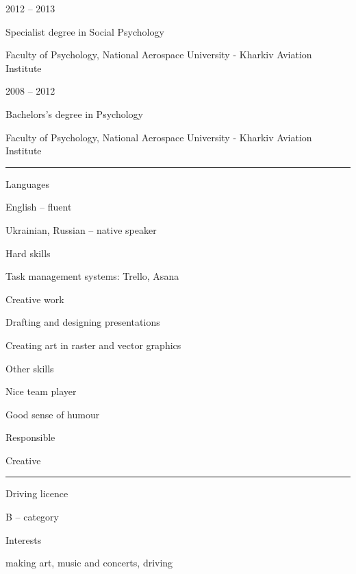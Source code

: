 \documentclass[a4paper,10pt]{article}
\newlength{\cvcolumngapwidth}
\newlength{\cvleftcolumnwidth}
\newlength{\cvrightcolumnwidth}
\newcommand{\cvsectionstyle}[1]{{\normalsize\cvsectionfont\textcolor{cvsectioncolor}{#1}}}
\newcommand{\cvtitlestyle}[1]{{\large\cvtitlefont\textcolor{cvtitlecolor}{#1}}}
\newcommand{\cvdurationstyle}[1]{{\small\cvdurationfont\textcolor{cvdurationcolor}{#1}}}
\newcommand{\cvheadingstyle}[1]{{\normalsize\cvheadingfont\textcolor{cvheadingcolor}{#1}}}
\newlength{\cvafteritemskipamount}
\newlength{\cvaftersectionskipamount}
\newlength{\cvbetweensectionandheadingextraskipamount}
\newlength{\cvaftertitleskipamount}
\newlength{\cvparskip}
\newcommand{\cvsection}[1]{
\begin{minipage}[t]{\cvleftcolumnwidth}
    \raggedleft\cvsectionstyle{#1}
\end{minipage}%
\hspace{\cvcolumngapwidth}%
\begin{minipage}[t]{\cvrightcolumnwidth}
    \textcolor{cvrulecolor}{\rule{\cvrightcolumnwidth}{0.3mm}}
\end{minipage}

\vspace{\cvaftersectionskipamount}
}
\newcommand{\cvitem}[2]{
\begin{minipage}[t]{\cvleftcolumnwidth}
    \raggedleft #1
\end{minipage}%
\hspace{\cvcolumngapwidth}%
\begin{minipage}[t]{\cvrightcolumnwidth}
    \setlength{\parskip}{\cvparskip} #2
\end{minipage}

\vspace{\cvafteritemskipamount}
}
\newcommand{\cvtitle}[1]{
\cvtitlestyle{#1}

\vspace{\cvaftertitleskipamount}
\vspace{-\cvparskip}
}
\begin{document}
\cvitem{
\cvdurationstyle{2012 -- 2013}
}{
\cvtitle{Specialist degree in Social Psychology}

Faculty of Psychology, National Aerospace University - Kharkiv Aviation Institute
}

\cvitem{
\cvdurationstyle{2008 -- 2012}
}{
\cvtitle{Bachelors's degree in Psychology}

Faculty of Psychology, National Aerospace University - Kharkiv Aviation Institute
}



\cvsection{SKILLS}

\vspace{\cvbetweensectionandheadingextraskipamount}

\cvitem{
\cvheadingstyle{Languages}
}{
English -- fluent 


Ukrainian, Russian -- native speaker
}

\cvitem{
\cvheadingstyle{Hard skills}
}{
Task management systems: Trello, Asana

Creative work

Drafting and designing
presentations

Creating art in raster and vector graphics

}
\cvitem{
\cvheadingstyle{Other skills}
}{
Nice team player


Good sense of humour

Responsible 

Creative
}



\cvsection{ADDITIONAL INFORMATION}

\vspace{\cvbetweensectionandheadingextraskipamount}

\cvitem{
\cvheadingstyle{Driving licence}
}{
B -- category
}

\cvitem{
\cvheadingstyle{Interests}
}{
making art, music and concerts, driving 
}
\end{document}

